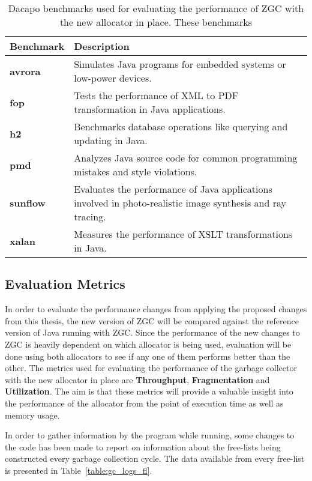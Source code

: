 \begin{table}[H]
  \centering
  \begin{tabular}{|l|p{10cm}|}
    \hline
    \textbf{Benchmark} & \textbf{Description} \\ \hline
    \textbf{avrora} & Simulates Java programs for embedded systems or low-power devices. \\ \hline
    \textbf{fop} & Tests the performance of XML to PDF transformation in Java applications. \\ \hline
    \textbf{h2} & Benchmarks database operations like querying and updating in Java. \\ \hline
    \textbf{pmd} & Analyzes Java source code for common programming mistakes and style violations. \\ \hline
    \textbf{sunflow} & Evaluates the performance of Java applications involved in photo-realistic image synthesis and ray tracing. \\ \hline
    \textbf{xalan} & Measures the performance of XSLT transformations in Java. \\ \hline
  \end{tabular}
  \caption{Dacapo benchmarks used for evaluating the performance of ZGC with the new allocator in place. These benchmarks}
  \label{table:dacapo_benchmarks}
\end{table}

\subsection{Evaluation Metrics}
In order to evaluate the performance changes from applying the proposed changes from this thesis, the new version of ZGC will be compared against the reference version of Java running with ZGC. Since the performance of the new changes to ZGC is heavily dependent on which allocator is being used, evaluation will be done using both allocators to see if any one of them performs better than the other. The metrics used for evaluating the performance of the garbage collector with the new allocator in place are \textbf{Throughput}, \textbf{Fragmentation} and \textbf{Utilization}. The aim is that these metrics will provide a valuable insight into the performance of the allocator from the point of execution time as well as memory usage.

In order to gather information by the program while running, some changes to the code has been made to report on information about the free-lists being constructed every garbage collection cycle. The data available from every free-list is presented in Table~\ref{table:gc_logs_fl}.

